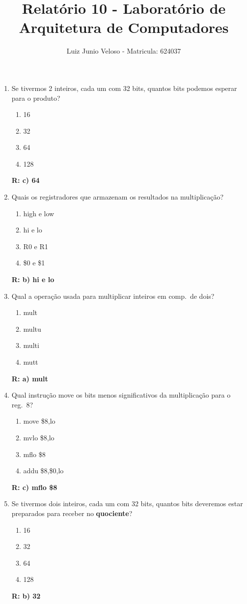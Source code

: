 \documentclass[a4paper,11pt,fleqn]{article}
\title{\vspace{-4cm}Relatório 10 - Laboratório de Arquitetura de Computadores}
\author{Luiz Junio Veloso - Matricula: 624037}
\begin{document}
\maketitle


\begin{enumerate}
    \item{Se tivermos 2 inteiros, cada um com 32 bits, quantos bits podemos esperar para o produto?}
        \begin{enumerate}
            \item{16}
            \item{32}
            \item{64}
            \item{128}
        \end{enumerate}
        \textbf{R: c) 64}

    \item{Quais os registradores que armazenam os resultados na multiplicação?}
        \begin{enumerate}
            \item{high e low}
            \item{hi e lo}
            \item{R0 e R1}
            \item{\$0 e \$1}
        \end{enumerate}
        \textbf{R: b) hi e lo}

    \item{Qual a operação usada para multiplicar inteiros em comp.\ de dois?}
        \begin{enumerate}
            \item{mult}
            \item{multu}
            \item{multi}
            \item{mutt}
        \end{enumerate}
        \textbf{R: a) mult}

    \item{Qual instrução move os bits menos significativos da multiplicação para o reg.\ 8?}
        \begin{enumerate}
            \item{move \$8,lo}
            \item{mvlo \$8,lo}
            \item{mflo \$8}
            \item{addu \$8,\$0,lo}
        \end{enumerate}
        \textbf{R: c) mflo \$8}
        \newpage
    \item{Se tivermos dois inteiros, cada um com 32 bits, quantos bits deveremos estar preparados para
            receber no \textbf{quociente}?}
        \begin{enumerate}
            \item{16}
            \item{32}
            \item{64}
            \item{128}
        \end{enumerate}
        \textbf{R: b) 32 }


\end{enumerate}
\end{document}
